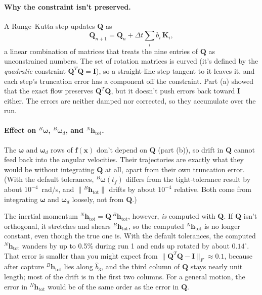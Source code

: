 \documentclass[11pt,letterpaper]{article}
\newcommand{\bw}{\boldsymbol{\omega}}
\newcommand{\bwd}{\boldsymbol{\omega}_d}
\newcommand{\Bw}{{}^{B}\boldsymbol{\omega}}
\newcommand{\Bwd}{{}^{B}\boldsymbol{\omega}_d}
\newcommand{\Nht}{{}^{N}\mathbf{h}_{\text{tot}}}
\newcommand{\Bht}{{}^{B}\mathbf{h}_{\text{tot}}}
\newcommand{\bQ}{\mathbf{Q}}
\newcommand{\bx}{\mathbf{x}}
\begin{document}
\paragraph{Why the constraint isn't preserved.} A Runge--Kutta step updates $\bQ$ as
\[
\bQ_{n+1} = \bQ_n + \Delta t\sum_i b_i\,\mathbf{K}_i,
\]
a linear combination of matrices that treats the nine entries of $\bQ$ as unconstrained numbers. The set of rotation matrices is curved (it's defined by the \emph{quadratic} constraint $\bQ^T\bQ = \mathbf{I}$), so a straight-line step tangent to it leaves it, and each step's truncation error has a component off the constraint. Part (a) showed that the exact flow preserves $\bQ^T\bQ$, but it doesn't push errors back toward $\mathbf{I}$ either. The errors are neither damped nor corrected, so they accumulate over the run.

\paragraph{Effect on $\Bw$, $\Bwd$, and $\Nht$.} The $\bw$ and $\bwd$ rows of $\mathbf{f}(\bx)$ don't depend on $\bQ$ (part (b)), so drift in $\bQ$ cannot feed back into the angular velocities. Their trajectories are exactly what they would be without integrating $\bQ$ at all, apart from their own truncation error. (With the default tolerances, $\Bw(t_f)$ differs from the tight-tolerance result by about $10^{-4}$~rad/s, and $\lVert\Bht\rVert$ drifts by about $10^{-4}$ relative. Both come from integrating $\bw$ and $\bwd$ loosely, not from $\bQ$.)

The inertial momentum $\Nht = \bQ\,\Bht$, however, \emph{is} computed with $\bQ$. If $\bQ$ isn't orthogonal, it stretches and shears $\Bht$, so the computed $\Nht$ is no longer constant, even though the true one is. With the default tolerances, the computed $\Nht$ wanders by up to 0.5\% during run 1 and ends up rotated by about $0.14^\circ$. That error is smaller than you might expect from $\lVert\bQ^T\bQ - \mathbf{I}\rVert_F \approx 0.1$, because after capture $\Bht$ lies along $\hat b_3$, and the third column of $\bQ$ stays nearly unit length; most of the drift is in the first two columns. For a general motion, the error in $\Nht$ would be of the same order as the error in $\bQ$.
\end{document}
